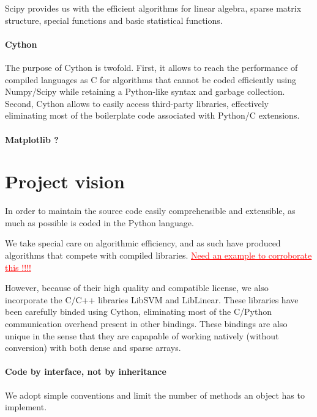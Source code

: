 \documentclass[twoside,11pt]{article}
\newcommand{\FABIAN}[1]{\textcolor{red}{\uline{#1}}}
\begin{document}
Scipy provides us with the efficient algorithms for linear algebra,
sparse matrix structure, special functions and basic statistical
functions.

\paragraph{Cython}

The purpose of Cython is twofold. First, it allows to reach the
performance of compiled languages as C for algorithms that cannot be
coded efficiently using Numpy/Scipy while retaining a Python-like
syntax and garbage collection. Second, Cython allows to easily access
third-party libraries, effectively eliminating most of the boilerplate
code associated with Python/C extensions.

\paragraph{Matplotlib ?}



\section {Project vision}

In order to maintain the source code easily comprehensible and
extensible, as much as possible is coded in the Python language. 

We take special care on algorithmic efficiency, and as such
have produced algorithms that compete with 
compiled libraries. \FABIAN{Need an example to corroborate this !!!!}


However,
because of their high quality and compatible license, we also
incorporate the C/C++ libraries LibSVM and LibLinear. These libraries
have been carefully binded using Cython, eliminating most of the
C/Python communication overhead present in other bindings. These
bindings are also unique in the sense that they are capapable of
working natively (without conversion) with both dense and sparse
arrays.



\paragraph{Code by interface, not by inheritance}
%

We adopt simple conventions and limit the number of methods an object
has to implement. 
\end{document}

